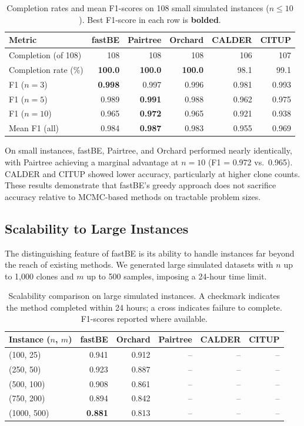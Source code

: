 \documentclass[11pt]{article}
\begin{document}
\begin{table}[H]
\centering
\caption{Completion rates and mean F1-scores on 108 small simulated instances ($n \leq 10$). Best F1-score in each row is \textbf{bolded}.}
\label{tab:small}
\begin{tabular}{lrrrrr}
\toprule
\textbf{Metric} & \textbf{fastBE} & \textbf{Pairtree} & \textbf{Orchard} & \textbf{CALDER} & \textbf{CITUP} \\
\midrule
Completion (of 108) & 108 & 108 & 108 & 106 & 107 \\
Completion rate (\%) & \textbf{100.0} & \textbf{100.0} & \textbf{100.0} & 98.1 & 99.1 \\
\midrule
F1 ($n{=}3$) & \textbf{0.998} & 0.997 & 0.996 & 0.981 & 0.993 \\
F1 ($n{=}5$) & 0.989 & \textbf{0.991} & 0.988 & 0.962 & 0.975 \\
F1 ($n{=}10$) & 0.965 & \textbf{0.972} & 0.965 & 0.921 & 0.938 \\
\midrule
Mean F1 (all) & 0.984 & \textbf{0.987} & 0.983 & 0.955 & 0.969 \\
\bottomrule
\end{tabular}
\end{table}

On small instances, fastBE, Pairtree, and Orchard performed nearly identically, with Pairtree achieving a marginal advantage at $n = 10$ (F1 = 0.972 vs.\ 0.965). CALDER and CITUP showed lower accuracy, particularly at higher clone counts. These results demonstrate that fastBE's greedy approach does not sacrifice accuracy relative to MCMC-based methods on tractable problem sizes.

\subsection{Scalability to Large Instances}

The distinguishing feature of fastBE is its ability to handle instances far beyond the reach of existing methods. We generated large simulated datasets with $n$ up to 1,000 clones and $m$ up to 500 samples, imposing a 24-hour time limit.

\begin{table}[H]
\centering
\caption{Scalability comparison on large simulated instances. A checkmark indicates the method completed within 24 hours; a cross indicates failure to complete. F1-scores reported where available.}
\label{tab:large_scale}
\begin{tabular}{lrrrrr}
\toprule
\textbf{Instance} ($n$, $m$) & \textbf{fastBE} & \textbf{Orchard} & \textbf{Pairtree} & \textbf{CALDER} & \textbf{CITUP} \\
\midrule
(100, 25) & 0.941 & 0.912 & -- & -- & -- \\
(250, 50) & 0.923 & 0.887 & -- & -- & -- \\
(500, 100) & 0.908 & 0.861 & -- & -- & -- \\
(750, 200) & 0.894 & 0.842 & -- & -- & -- \\
(1000, 500) & \textbf{0.881} & 0.813 & -- & -- & -- \\
\bottomrule
\end{tabular}
\end{table}
\end{document}
